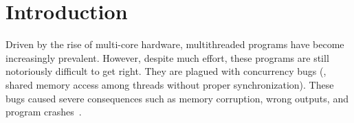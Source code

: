 \section{Introduction} \label{sec:intro}

Driven by the rise of multi-core hardware, multithreaded programs have become
increasingly prevalent. However, despite much effort,
these programs are still notoriously difficult to get right. They are 
plagued with concurrency bugs (\ie, shared memory access among threads without 
proper synchronization). These bugs caused severe consequences such as 
memory corruption, wrong outputs, and program 
crashes~\cite{lu:concurrency-bugs}. 
